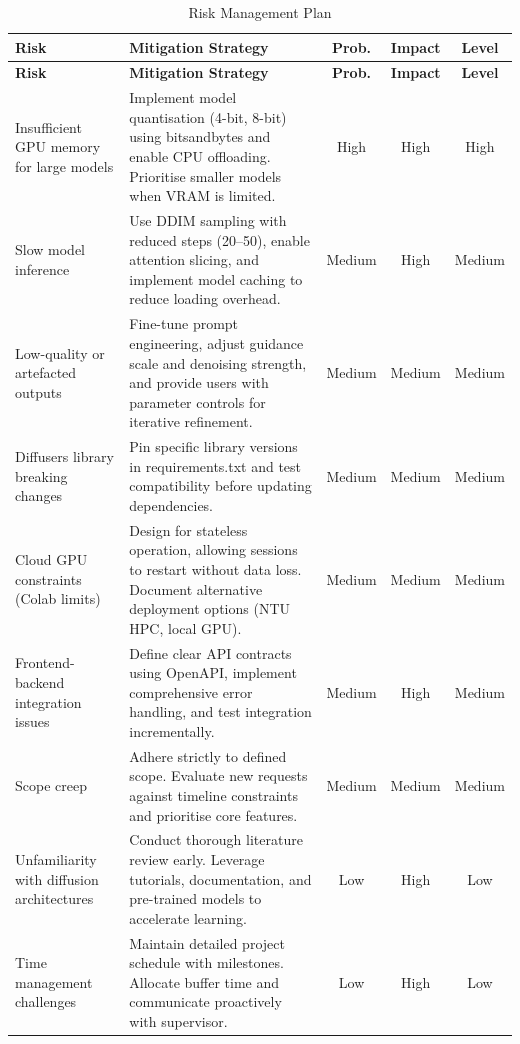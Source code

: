 \documentclass[12pt,a4paper]{report}
\begin{document}
\footnotesize
\renewcommand{\arraystretch}{1.4}
\setlength{\tabcolsep}{5pt}
\begin{longtable}{|>{\raggedright\arraybackslash}p{2.2cm}|>{\raggedright\arraybackslash}p{6.2cm}|c|c|c|}
\caption{Risk Management Plan} \label{tab:risk} \\
\hline
\textbf{Risk} & \textbf{Mitigation Strategy} & \textbf{Prob.} & \textbf{Impact} & \textbf{Level} \\
\hline
\endfirsthead
\hline
\textbf{Risk} & \textbf{Mitigation Strategy} & \textbf{Prob.} & \textbf{Impact} & \textbf{Level} \\
\hline
\endhead
\hline
\endfoot

Insufficient GPU memory for large models & Implement model quantisation (4-bit, 8-bit) using bitsandbytes and enable CPU offloading. Prioritise smaller models when VRAM is limited. & High & High & High \\
\hline
Slow model inference & Use DDIM sampling with reduced steps (20--50), enable attention slicing, and implement model caching to reduce loading overhead. & Medium & High & Medium \\
\hline
Low-quality or artefacted outputs & Fine-tune prompt engineering, adjust guidance scale and denoising strength, and provide users with parameter controls for iterative refinement. & Medium & Medium & Medium \\
\hline
Diffusers library breaking changes & Pin specific library versions in requirements.txt and test compatibility before updating dependencies. & Medium & Medium & Medium \\
\hline
Cloud GPU constraints (Colab limits) & Design for stateless operation, allowing sessions to restart without data loss. Document alternative deployment options (NTU HPC, local GPU). & Medium & Medium & Medium \\
\hline
Frontend-backend integration issues & Define clear API contracts using OpenAPI, implement comprehensive error handling, and test integration incrementally. & Medium & High & Medium \\
\hline
Scope creep & Adhere strictly to defined scope. Evaluate new requests against timeline constraints and prioritise core features. & Medium & Medium & Medium \\
\hline
Unfamiliarity with diffusion architectures & Conduct thorough literature review early. Leverage tutorials, documentation, and pre-trained models to accelerate learning. & Low & High & Low \\
\hline
Time management challenges & Maintain detailed project schedule with milestones. Allocate buffer time and communicate proactively with supervisor. & Low & High & Low \\
\hline

\end{longtable}
\normalsize
\setlength{\tabcolsep}{6pt}
\end{document}
